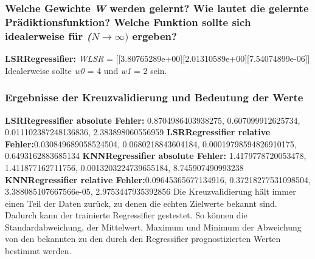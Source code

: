\subsubsection{Welche Gewichte \textit{W} werden gelernt? Wie lautet die gelernte Prädiktionsfunktion? Welche Funktion sollte sich idealerweise für \textit{($N \rightarrow \infty)$} ergeben?}

\textbf{LSRRegressifier: } \textit{W\textunderscore LSR} = [[3.80765289e+00][2.01310589e+00][7.54074899e-06]]
 \newline
\noindent
 \vspace{0px}
 Idealerweise sollte \textit{w0} = 4 und \textit{w1} = 2 sein.
\subsubsection{ Ergebnisse der Kreuzvalidierung und Bedeutung der Werte }
\noindent
 \vspace{0px}
 \textbf{LSRRegressifier absolute Fehler: }0.8704986403938275, 0.607099912625734, 0.011102387248136836, 2.383898060556959 
 \newline
 \noindent
 \vspace{0px}
 \textbf{LSRRegressifier relative Fehler:}0.030849689058524504, 0.0680218843604184, 0.00019798594826910175, 0.6493162883685134
 \newline
\noindent
 \vspace{0px}
 \textbf{KNNRegressifier absolute Fehler: }1.4179778720053478, 1.411877162711756, 0.0013203224739655184, 8.745907490993238
 \newline
 \noindent
 \vspace{0px}
 \textbf{KNNRegressifier relative Fehler:}0.09645365677134916, 0.37218277531098504, 3.388085107667566e-05, 2.9753447935392856
 \noindent
 \vspace{0px}
 \newline
 Die Kreuzvalidierung hält immer einen Teil der Daten zurück, zu denen die \dq echten \dq Zielwerte bekannt sind. Dadurch kann der trainierte Regressifier gestestet. 
 So können die Standardabweichung, der Mittelwert, Maximum und Minimum der Abweichung von den bekannten zu den durch den Regressifier prognostizierten Werten bestimmt werden. 

 
